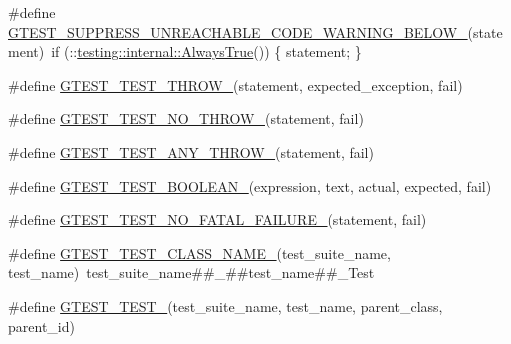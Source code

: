 \begin{DoxyCompactItemize}
\item 
\#define \mbox{\hyperlink{googletest-master_2googletest_2include_2gtest_2internal_2gtest-internal_8h_a2e66f7dfc5cb87e0fa0289f653173c69}{G\+T\+E\+S\+T\+\_\+\+S\+U\+P\+P\+R\+E\+S\+S\+\_\+\+U\+N\+R\+E\+A\+C\+H\+A\+B\+L\+E\+\_\+\+C\+O\+D\+E\+\_\+\+W\+A\+R\+N\+I\+N\+G\+\_\+\+B\+E\+L\+O\+W\+\_\+}}(statement)~if (\+::\mbox{\hyperlink{namespacetesting_1_1internal_a922c9da63cd4bf94fc473b9ecac76414}{testing\+::internal\+::\+Always\+True}}()) \{ statement; \}
\item 
\#define \mbox{\hyperlink{googletest-master_2googletest_2include_2gtest_2internal_2gtest-internal_8h_a3f71db93eaf30b0cfca9612b9ac32106}{G\+T\+E\+S\+T\+\_\+\+T\+E\+S\+T\+\_\+\+T\+H\+R\+O\+W\+\_\+}}(statement,  expected\+\_\+exception,  fail)
\item 
\#define \mbox{\hyperlink{googletest-master_2googletest_2include_2gtest_2internal_2gtest-internal_8h_a9a109d026b5a904646437d7570e13581}{G\+T\+E\+S\+T\+\_\+\+T\+E\+S\+T\+\_\+\+N\+O\+\_\+\+T\+H\+R\+O\+W\+\_\+}}(statement,  fail)
\item 
\#define \mbox{\hyperlink{googletest-master_2googletest_2include_2gtest_2internal_2gtest-internal_8h_af48bbd26d54d4afc5e4cef39b1c76ba3}{G\+T\+E\+S\+T\+\_\+\+T\+E\+S\+T\+\_\+\+A\+N\+Y\+\_\+\+T\+H\+R\+O\+W\+\_\+}}(statement,  fail)
\item 
\#define \mbox{\hyperlink{googletest-master_2googletest_2include_2gtest_2internal_2gtest-internal_8h_ae8912365e1d00a7a2bd248268c64aa1a}{G\+T\+E\+S\+T\+\_\+\+T\+E\+S\+T\+\_\+\+B\+O\+O\+L\+E\+A\+N\+\_\+}}(expression,  text,  actual,  expected,  fail)
\item 
\#define \mbox{\hyperlink{googletest-master_2googletest_2include_2gtest_2internal_2gtest-internal_8h_a1b37a3c446836d33040f3266a6236081}{G\+T\+E\+S\+T\+\_\+\+T\+E\+S\+T\+\_\+\+N\+O\+\_\+\+F\+A\+T\+A\+L\+\_\+\+F\+A\+I\+L\+U\+R\+E\+\_\+}}(statement,  fail)
\item 
\#define \mbox{\hyperlink{googletest-master_2googletest_2include_2gtest_2internal_2gtest-internal_8h_ad4bc4ec847a06e7de981e81c9bb116cf}{G\+T\+E\+S\+T\+\_\+\+T\+E\+S\+T\+\_\+\+C\+L\+A\+S\+S\+\_\+\+N\+A\+M\+E\+\_\+}}(test\+\_\+suite\+\_\+name,  test\+\_\+name)~test\+\_\+suite\+\_\+name\#\#\+\_\+\#\#test\+\_\+name\#\#\+\_\+\+Test
\item 
\#define \mbox{\hyperlink{googletest-master_2googletest_2include_2gtest_2internal_2gtest-internal_8h_ab43103f7842de04474e362689f782a46}{G\+T\+E\+S\+T\+\_\+\+T\+E\+S\+T\+\_\+}}(test\+\_\+suite\+\_\+name,  test\+\_\+name,  parent\+\_\+class,  parent\+\_\+id)
\end{DoxyCompactItemize}
